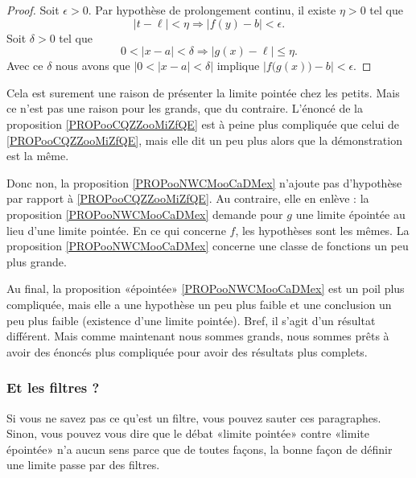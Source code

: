 \begin{proof}
    Soit \( \epsilon>0\). Par hypothèse de prolongement continu, il existe \( \eta>0\) tel que
    \begin{equation}
        | t-\ell |<\eta\Rightarrow | f(y)-b |<\epsilon.
    \end{equation}
    Soit \( \delta>0\) tel que
    \begin{equation}
        0<| x-a |<\delta\Rightarrow | g(x)-\ell |\leq \eta.
    \end{equation}
    Avec ce \( \delta\) nous avons que \( | 0<| x-a |<\delta |\) implique \( | f\big( g(x) \big)-b |<\epsilon\).
\end{proof}

Cela est surement une raison de présenter la limite pointée chez les petits. Mais ce n'est pas une raison pour les grands, que du contraire. L'énoncé de la proposition \ref{PROPooCQZZooMiZfQE} est à peine plus compliquée que celui de \ref{PROPooCQZZooMiZfQE}, mais elle dit un peu plus alors que la démonstration est la même.

Donc non, la proposition \ref{PROPooNWCMooCaDMex} n'ajoute pas d'hypothèse par rapport à \ref{PROPooCQZZooMiZfQE}. Au contraire, elle en enlève : la proposition \ref{PROPooNWCMooCaDMex} demande pour \( g\) une limite épointée au lieu d'une limite pointée. En ce qui concerne \( f\), les hypothèses sont les mêmes. La proposition \ref{PROPooNWCMooCaDMex} concerne une classe de fonctions un peu plus grande.

Au final, la proposition «épointée» \ref{PROPooNWCMooCaDMex} est un poil plus compliquée, mais elle a une hypothèse un peu plus faible et une conclusion un peu plus faible (existence d'une limite pointée). Bref, il s'agit d'un résultat différent. Mais comme maintenant nous sommes grands, nous sommes prêts à avoir des énoncés plus compliquée pour avoir des résultats plus complets.

\subsubsection{Et les filtres ?}

Si vous ne savez pas ce qu'est un filtre, vous pouvez sauter ces paragraphes. Sinon, vous pouvez vous dire que le débat «limite pointée» contre «limite épointée» n'a aucun sens parce que de toutes façons, la bonne façon de définir une limite passe par des filtres.

